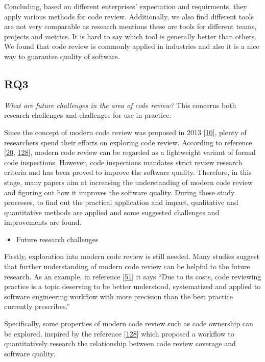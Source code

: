 \documentclass[]{book}
\providecommand{\tightlist}{%
  \setlength{\itemsep}{0pt}\setlength{\parskip}{0pt}}
\begin{document}
Concluding, based on different enterprises' expectation and requirments,
they apply various methods for code review. Additionally, we also find
different tools are not very comparable as research mentions these are
tools for different teams, projects and metrics. It is hard to say which
tool is generally better than others. We found that code review is
commonly applied in industries and also it is a nice way to guarantee
quality of software.

\subsection{RQ3}\label{rq3}

\emph{What are future challenges in the area of code review?} This
concerns both research challenges and challenges for use in practice.

Since the concept of modern code review was proposed in 2013
{[}\protect\hyperlink{ref-bacchelli2013expectations}{10}{]}, plenty of
researchers spend their efforts on exploring code review. According to
reference {[}\protect\hyperlink{ref-beller2014modern}{20},
\protect\hyperlink{ref-mcintosh2014impact}{128}{]}, modern code review
can be regarded as a lightweight variant of formal code inspections.
However, code inspections mandates strict review research criteria and
has been proved to improve the software quality. Therefore, in this
stage, many papers aim at increasing the understanding of modern code
review and figuring out how it improves the software quality. During
these study processes, to find out the practical application and impact,
qualitative and quantitative methods are applied and some suggested
challenges and improvements are found.

\begin{itemize}
\tightlist
\item
  Future research challenges
\end{itemize}

Firstly, exploration into modern code review is still needed. Many
studies suggest that further understanding of modern code review can be
helpful to the future research. As an example, in reference
{[}\protect\hyperlink{ref-czerwonka2015code}{51}{]} it says ``Due to its
costs, code reviewing practice is a topic deserving to be better
understood, systematized and applied to software engineering workflow
with more precision than the best practice currently prescribes.''

Specifically, some properties of modern code review such as code
ownership can be explored, inspired by the reference
{[}\protect\hyperlink{ref-mcintosh2014impact}{128}{]} which proposed a
workflow to quantitatively research the relationship between code review
coverage and software quality.
\end{document}
